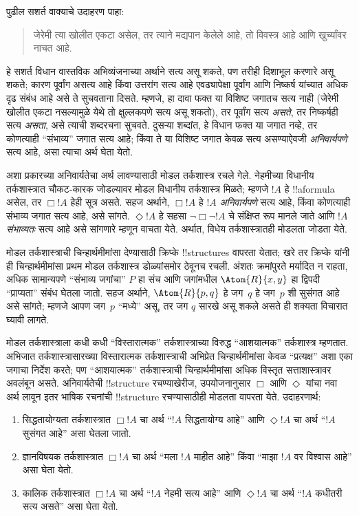 \documentclass[../../../include/open-logic-section]{subfiles}
\begin{document}


पुढील सशर्त वाक्याचे उदाहरण पाहा:
\begin{quote}
  जेरेमी त्या खोलीत एकटा असेल, तर त्याने मद्यपान केलेले आहे, तो विवस्त्र आहे
  आणि खुर्च्यांवर नाचत आहे.
\end{quote}
हे सशर्त विधान वास्तविक अभिव्यंजनाच्या अर्थाने सत्य असू शकते, पण तरीही
दिशाभूल करणारे असू शकते; कारण पूर्वांग असत्य आहे किंवा उत्तरांग सत्य आहे
एवढ्यापेक्षा पूर्वांग
आणि निष्कर्ष यांच्यात अधिक दृढ संबंध आहे असे ते सुचवताना दिसते. म्हणजे, हा
दावा फक्त या विशिष्ट जगातच सत्य नाही (जेरेमी खोलीत एकटा नसल्यामुळे येथे तो
क्षुल्लकपणे सत्य असू शकतो), तर पूर्वांग सत्य \emph{असते}, तर निष्कर्षही सत्य
\emph{असता}, असे त्याची शब्दरचना सुचवते. दुसऱ्या शब्दांत, हे विधान फक्त या
जगात नव्हे, तर कोणत्याही “संभाव्य” जगात सत्य आहे; किंवा ते या विशिष्ट जगात
केवळ सत्य असण्याऐवजी \emph{अनिवार्यपणे} सत्य आहे, असा त्याचा अर्थ घेता येतो.

अशा प्रकारच्या अनिवार्यतेचा अर्थ लावण्यासाठी मोडल तर्कशास्त्र रचले गेले.
नेहमीच्या विधानीय तर्कशास्त्रात चौकट-कारक जोडल्यावर मोडल विधानीय
तर्कशास्त्र मिळते; म्हणजे $!A$ हे !!a{formula} असेल, तर $\Box !A$ हेही
सूत्र असते. सहज अर्थाने, $\Box !A$ हे $!A$ \emph{अनिवार्यपणे} सत्य
आहे, किंवा कोणत्याही संभाव्य जगात सत्य आहे, असे सांगते. $\Diamond !A$ हे
सहसा $\lnot \Box \lnot !A$ चे संक्षिप्त रूप मानले जाते आणि $!A$
\emph{संभाव्यतः} सत्य आहे असे सांगणारे म्हणून वाचता येते. अर्थात, विधेय
तर्कशास्त्रातही मोडलता जोडता येते.

मोडल तर्कशास्त्राची चिन्हार्थमीमांसा देण्यासाठी क्रिप्के !!{structure}s वापरता
येतात; खरे तर क्रिप्के यांनी ही चिन्हार्थमीमांसा प्रथम मोडल तर्कशास्त्र
डोळ्यांसमोर ठेवूनच रचली. अंशतः क्रमांपुरते मर्यादित न राहता, अधिक सामान्यपणे
“संभाव्य जगांचा” $P$ हा संच आणि जगांमधील $\Atom{R}{x,y}$ हा द्विपदी
“प्राप्यता” संबंध घेतला जातो. सहज अर्थाने, $\Atom{R}{p,q}$ हे जग~$q$ हे
जग~$p$ शी सुसंगत आहे असे सांगते; म्हणजे आपण जग~$p$ “मध्ये” असू, तर जग
$q$ सारखे असू शकले असते ही शक्यता विचारात घ्यावी लागते.

मोडल तर्कशास्त्राला कधी कधी “विस्तारात्मक” तर्कशास्त्राच्या विरुद्ध
“आशयात्मक” तर्कशास्त्र म्हणतात. अभिजात तर्कशास्त्रासारख्या विस्तारात्मक
तर्कशास्त्राची अभिप्रेत चिन्हार्थमीमांसा केवळ “प्रत्यक्ष” अशा एका जगाचा
निर्देश करते; पण “आशयात्मक” तर्कशास्त्राची चिन्हार्थमीमांसा अधिक विस्तृत
सत्ताशास्त्रावर अवलंबून असते. अनिवार्यतेची !!{structure} रचण्याखेरीज,
उपयोजनानुसार $\Box$ आणि $\Diamond$ यांचा नवा अर्थ लावून इतर भाषिक रचनांची
!!{structure} रचण्यासाठीही मोडलता वापरता येते. उदाहरणार्थ:
\begin{enumerate}
\item सिद्धतायोग्यता तर्कशास्त्रात $\Box !A$ चा अर्थ “$!A$ सिद्धतायोग्य
  आहे” आणि $\Diamond !A$ चा अर्थ “$!A$ सुसंगत आहे” असा घेतला जातो.
\item ज्ञानविषयक तर्कशास्त्रात $\Box !A$ चा अर्थ “मला $!A$ माहीत आहे” किंवा
  “माझा $!A$ वर विश्वास आहे” असा घेता येतो.
\item कालिक तर्कशास्त्रात $\Box !A$ चा अर्थ “$!A$ नेहमी सत्य आहे” आणि
  $\Diamond !A$ चा अर्थ “$!A$ कधीतरी सत्य असते” असा घेता येतो.
\end{enumerate}
\end{document}
